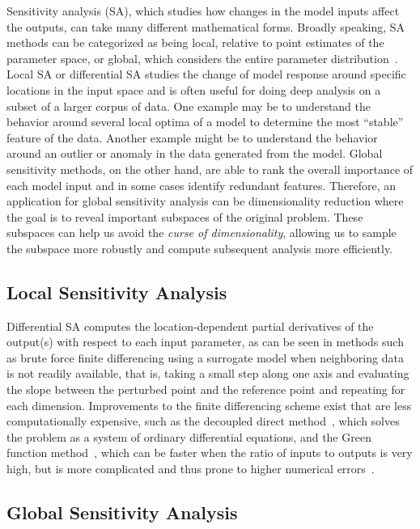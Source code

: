 Sensitivity analysis (SA), which studies how changes in the model inputs affect the outputs, can take many different mathematical forms.
%
Broadly speaking, SA methods can be categorized as being local, relative to point estimates of the parameter space, or global, which considers the entire parameter distribution~\cite{Hamby1995}.
%
Local SA or differential SA studies the change of model response around specific locations in the input space and is often useful for doing deep analysis on a subset of a larger corpus of data.
%
One example may be to understand the behavior around several local optima of a model to determine the most ``stable'' feature of the data.
%
Another example might be to understand the behavior around an outlier or anomaly in the data generated from the model.
%
Global sensitivity methods, on the other hand, are able to rank the overall importance of each model input and in some cases identify redundant features.
%
Therefore, an application for global sensitivity analysis can be dimensionality reduction where the goal is to reveal important subspaces of the original problem.
%
These subspaces can help us avoid the \emph{curse of dimensionality}, allowing us to sample the subspace more robustly and compute subsequent analysis more efficiently.

\subsection{Local Sensitivity Analysis}

Differential SA computes the location-dependent partial derivatives of the output(s) with respect to each input parameter, as can be seen in methods such as brute force finite differencing using a surrogate model when neighboring data is not readily available, that is, taking a small step along one axis and evaluating the slope between the perturbed point and the reference point and repeating for each dimension.
%
Improvements to the finite differencing scheme exist that are less computationally expensive, such as the decoupled direct method~\cite{Dunker1981,Dunker1984}, which solves the problem as a system of ordinary differential equations, and the Green function method~\cite{KramerCaloRabitz1981}, which can be faster when the ratio of inputs to outputs is very high, but is more complicated and thus prone to higher numerical errors~\cite{SaltelliChanScott2000}.

\subsection{Global Sensitivity Analysis}

